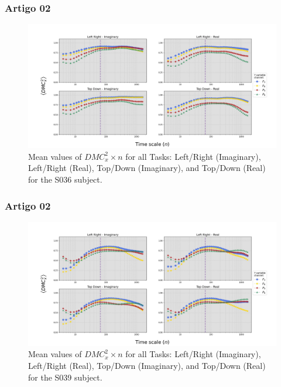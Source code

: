 \documentclass[11pt, aspectratio=169]{beamer}
\begin{document}
\begin{frame}
  \frametitle{Artigo 02}

  \begin{figure}[!h]
    \includegraphics[height=.5\paperheight]{../Figures/art_02/Fig4.jpg}
    \caption{Mean values of $DMC_{x}^{2} \times n$ for all Tasks: Left/Right (Imaginary), Left/Right (Real), Top/Down (Imaginary), and Top/Down (Real) for the S036 subject.}
    \label{fig04}
  \end{figure}
\end{frame}

\begin{frame}
  \frametitle{Artigo 02}

  \begin{figure}[!h]
    \includegraphics[height=.5\paperheight]{../Figures/art_02/Fig5.jpg}
    \caption{Mean values of $DMC_{x}^{2} \times n$ for all Tasks: Left/Right (Imaginary), Left/Right (Real), Top/Down (Imaginary), and Top/Down (Real) for the S039 subject.}
    \label{fig05}
  \end{figure}
\end{frame}
\end{document}
